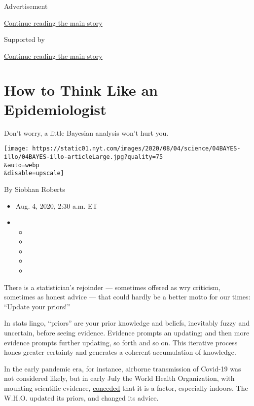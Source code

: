 Advertisement

\protect\hyperlink{after-top}{Continue reading the main story}

Supported by

\protect\hyperlink{after-sponsor}{Continue reading the main story}

\hypertarget{how-to-think-like-an-epidemiologist}{%
\section{How to Think Like an
Epidemiologist}\label{how-to-think-like-an-epidemiologist}}

Don't worry, a little Bayesian analysis won't hurt you.

\texttt{[image: https://static01.nyt.com/images/2020/08/04/science/04BAYES-illo/04BAYES-illo-articleLarge.jpg?quality=75\\\&auto=webp\\\&disable=upscale]}

By Siobhan Roberts

\begin{itemize}
\item
  Aug. 4, 2020, 2:30 a.m. ET
\item
  \begin{itemize}
  \item
  \item
  \item
  \item
  \item
  \end{itemize}
\end{itemize}

There is a statistician's rejoinder --- sometimes offered as wry
criticism, sometimes as honest advice --- that could hardly be a better
motto for our times: ``Update your priors!''

In stats lingo, ``priors'' are your prior knowledge and beliefs,
inevitably fuzzy and uncertain, before seeing evidence. Evidence prompts
an updating; and then more evidence prompts further updating, so forth
and so on. This iterative process hones greater certainty and generates
a coherent accumulation of knowledge.

In the early pandemic era, for instance, airborne transmission of
Covid-19 was not considered likely, but in early July the World Health
Organization, with mounting scientific evidence,
\href{https://www.nytimes.com/2020/07/30/opinion/coronavirus-aerosols.html?surface=most-popular\&fellback=false\&req_id=877412152\&algo=top_conversion\&imp_id=115726583\&action=click\&module=Most\%20Popular\&pgtype=Homepage}{conceded}
that it is a factor, especially indoors. The W.H.O. updated its priors,
and changed its advice.

